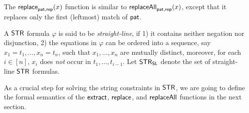 The $\mathsf{replace}_{\mathsf{pat}, \mathsf{rep}}(x)$ function is similar to $\mathsf{replaceAll}_{\mathsf{pat}, \mathsf{rep}}(x)$, except that it replaces only the first (leftmost) match of $\mathsf{pat}$.

A $\mathsf{STR}$ formula $\varphi$ is said to be \emph{straight-line}, if 1) it contains neither negation nor disjunction, 2) the equations in $\varphi$ can be ordered into a sequence, say $x_1 = t_1, \ldots, x_n = t_n$, such that $x_1,\ldots, x_n$ are mutually distinct, moreover, for each $i \in [n]$, $x_i$ does \emph{not} occur in $t_1, \ldots, t_{i-1}$. Let $\mathsf{STR}_{\mathsf{SL}}$ denote the set of straight-line $\mathsf{STR}$ formulas.

As a crucial step for solving the string constraints in $\mathsf{STR}$, we are going to define the formal semantics of the $\mathsf{extract}$, $\mathsf{replace}$, and $\mathsf{replaceAll}$ functions in the next section.

%
%
%
%
%
%
